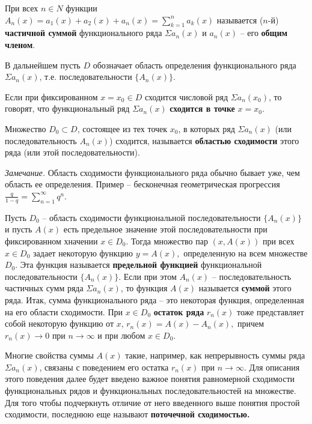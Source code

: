 \begin{object} При всех $n\in N$ функции $A_n(x)=a_1(x)+a_2(x)+a_n(x)=\sum^{n}_{k=1}a_k(x)$ называется ($n$-й) \textbf{частичной суммой} функционального ряда $\Sigma a_n(x)$ и $a_n(x)$ -- его \textbf{общим членом}.\end{object}\smallskip

В дальнейшем пусть $D$ обозначает область определения функционального ряда $\Sigma a_n(x)$, т.е. последовательности $\{ A_n(x)\}$.\smallskip

\begin{object} Если при фиксированном $x=x_0\in D$ сходится числовой ряд $\Sigma a_n(x_0)$, то говорят, что функциональный ряд $\Sigma a_n(x)$ \textbf{сходится в точке} $x=x_0$.\end{object}\smallskip

\begin{object} Множество $D_0\subset D$, состоящее из тех точек $x_0$, в которых ряд $\Sigma a_n(x)$ (или последовательность $A_n(x)$) сходится, называется \textbf{областью сходимости} этого ряда (или этой последовательности).\end{object}\smallskip

\textit{Замечание.} Область сходимости функционального ряда обычно бывает уже, чем область ее определения. Пример -- бесконечная геометрическая прогрессия $\frac{q}{1-q}=\sum^{\infty}_{n=1}q^n$.\smallskip

\begin{object} Пусть $D_0$ -- область сходимости функциональной последовательности $\{ A_n(x)\}$ и пусть $A(x)$ есть предельное значение этой последовательности при фиксированном хначении $x\in D_0$. Тогда множество пар $(x,A(x))$ при всех $x\in D_0$ задает некоторую функцию $y=A(x),$ определенную на всем множестве $D_0$. Эта функция называется \textbf{предельной функцией} функциональной последовательности $\{ A_n(x)\}$. Если при этом $A_n(x)$ -- последовательность частичных сумм ряда $\Sigma a_n(x)$, то функция $A(x)$ называется \textbf{суммой} этого ряда. Итак, сумма функционального ряда -- это некоторая функция, определенная на его области сходимости. При $x\in D_0$ \textbf{остаток ряда} $r_n(x)$ тоже представляет собой некоторую функцию от $x$, $r_n(x)=A(x)-A_n(x),$ причем $r_n(x)\to 0$ при $n\to \infty$ и при любом $x\in D_0$.\end{object}\smallskip

Многие свойства суммы $A(x)$ такие, например, как непрерывность суммы ряда $\Sigma a_n(x)$, связаны с поведением его остатка $r_n(x)$ при $n\to \infty$. Для описания этого поведения далее будет введено важное понятия равномерной сходимости функциональных рядов и функциональных последовательностей на множестве. Для того чтобы подчеркнуть отличие от него введенного выше понятия простой сходимости, последнюю еще называют \textbf{поточечной сходимостью.}

